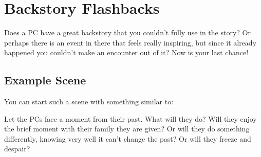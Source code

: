 \section{Backstory Flashbacks}
\label{sec:backstoryFlashback}

Does a PC have a great backstory that you couldn't fully use in the story? Or perhaps there is an event in there that feels really inspiring, but since it already happened you couldn't make an encounter out of it? Now is your last chance!



\subsection{Example Scene}

You can start such a scene with something similar to:


Let the PCs face a moment from their past. What will they do? Will they enjoy the brief moment with their family they are given? Or will they do something differently, knowing very well it can't change the past? Or will they freeze and despair?